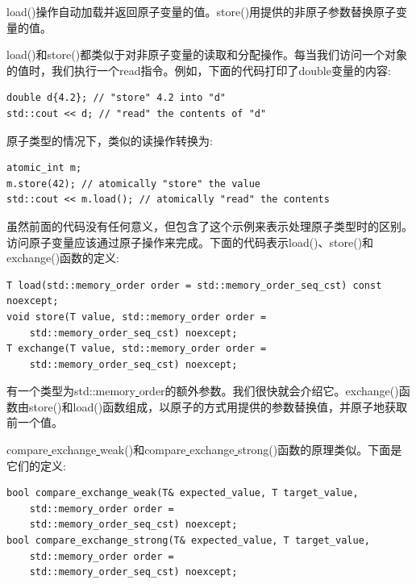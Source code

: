 load()操作自动加载并返回原子变量的值。store()用提供的非原子参数替换原子变量的值。 \par
load()和store()都类似于对非原子变量的读取和分配操作。每当我们访问一个对象的值时，我们执行一个read指令。例如，下面的代码打印了double变量的内容: \par

\begin{lstlisting}[caption={}]
double d{4.2}; // "store" 4.2 into "d"
std::cout << d; // "read" the contents of "d"
\end{lstlisting}

原子类型的情况下，类似的读操作转换为: \par

\begin{lstlisting}[caption={}]
atomic_int m;
m.store(42); // atomically "store" the value
std::cout << m.load(); // atomically "read" the contents
\end{lstlisting}

虽然前面的代码没有任何意义，但包含了这个示例来表示处理原子类型时的区别。访问原子变量应该通过原子操作来完成。下面的代码表示load()、store()和exchange()函数的定义: \par

\begin{lstlisting}[caption={}]
T load(std::memory_order order = std::memory_order_seq_cst) const noexcept;
void store(T value, std::memory_order order =
	std::memory_order_seq_cst) noexcept;
T exchange(T value, std::memory_order order =
	std::memory_order_seq_cst) noexcept;
\end{lstlisting}

有一个类型为std::memory\underline{ }order的额外参数。我们很快就会介绍它。exchange()函数由store()和load()函数组成，以原子的方式用提供的参数替换值，并原子地获取前一个值。 \par
compare\underline{ }exchange\underline{ }weak()和compare\underline{ }exchange\underline{ }strong()函数的原理类似。下面是它们的定义: \par

\begin{lstlisting}[caption={}]
bool compare_exchange_weak(T& expected_value, T target_value,
	std::memory_order order =
	std::memory_order_seq_cst) noexcept;
bool compare_exchange_strong(T& expected_value, T target_value,
	std::memory_order order =
	std::memory_order_seq_cst) noexcept;
\end{lstlisting}

